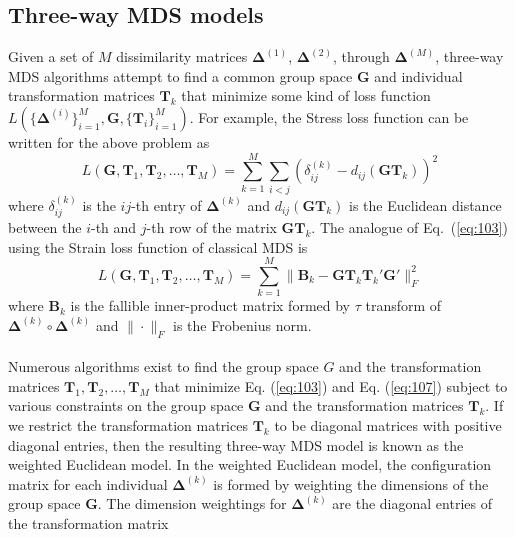 \subsection{Three-way MDS models}
\label{sec:three-way-mds-1}
Given a set of $M$ dissimilarity matrices $\bm{\Delta}^{(1)}$,
$\bm{\Delta}^{(2)}$, through $\bm{\Delta}^{(M)}$, three-way MDS
algorithms attempt to find a common group space $\mathbf{G}$ and
individual transformation matrices $\mathbf{T}_k$ that minimize some kind
of loss function $L(\{\bm{\Delta}^{(i)}\}_{i=1}^{M}, \mathbf{G},
\{\mathbf{T}_i\}_{i=1}^{M})$. For example, the Stress loss function
\citep{kruskal64:_nonmet} can be written for the above problem as
\begin{equation}
  \label{eq:103}
  L(\mathbf{G}, \mathbf{T}_1, \mathbf{T}_{2}, \dots, \mathbf{T}_M) =
  \sum_{k = 1}^{M}\sum_{i < j} (\delta_{ij}^{(k)} -
  d_{ij}(\mathbf{G}\mathbf{T}_k))^2
\end{equation}
where $\delta_{ij}^{(k)}$ is the $ij$-th entry of $\bm{\Delta}^{(k)}$
and $d_{ij}(\mathbf{G}\mathbf{T}_k)$ is the Euclidean distance between
the $i$-th and $j$-th row of the matrix
$\mathbf{G}\mathbf{T}_k$. The analogue of Eq.~(\ref{eq:103}) using the
Strain loss function of classical MDS \citep{torgersen52:_multid,gower66:_some} is 
\begin{equation}
  \label{eq:107}
  L(\mathbf{G}, \mathbf{T}_1, \mathbf{T}_2, \dots, \mathbf{T}_M)
  = \sum_{k = 1}^{M}\| \mathbf{B}_k -
  \mathbf{G}\mathbf{T}_k \mathbf{T}_k' \mathbf{G}' \|_F^2 
\end{equation}
where $\mathbf{B}_k$ is the fallible inner-product
matrix formed by  $\tau$ transform of $\bm{\Delta}^{(k)}
\circ \bm{\Delta}^{(k)}$ and $\| \cdot \|_F$ is the Frobenius norm. \\ \\ 
%
\noindent Numerous algorithms exist to find the group space $G$ and
the transformation matrices $\mathbf{T}_1, \mathbf{T}_{2}, \dots,
\mathbf{T}_M$ that minimize Eq. (\ref{eq:103}) and Eq. (\ref{eq:107})
subject to various constraints on the group space $\mathbf{G}$ and
the transformation matrices $\mathbf{T}_k$. If we restrict the
transformation matrices $\mathbf{T}_k$ to be diagonal matrices with
positive diagonal entries, then the resulting three-way MDS model is
known as the weighted Euclidean model. In the weighted Euclidean
model, the configuration matrix for each individual
$\bm{\Delta}^{(k)}$ is formed by weighting the dimensions of the group
space $\mathbf{G}$. The dimension weightings for $\bm{\Delta}^{(k)}$
are the diagonal entries of the transformation matrix
